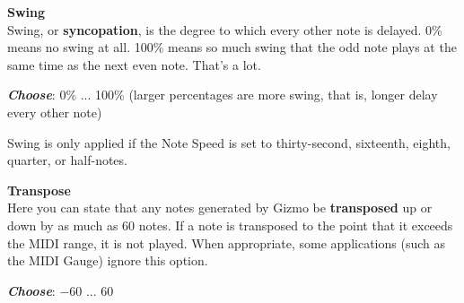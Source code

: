 \documentclass{article}
\begin{document}
\begin{description}
%	


	\item{\bf Swing}\\
			Swing, or {\bf syncopation}, is the degree to which every other note is delayed.  0\% means no swing at all.  100\% means so much swing that the odd note plays at the same time as the next even note.  That's a lot.
		\begin{description}
		\item{\bf \textit{Choose}}: 0\% ... 100\% (larger percentages are more swing, that is, longer delay every other note)
		\end{description}

		Swing is only applied if the Note Speed is set to thirty-second, sixteenth, eighth, quarter, or half-notes.

	\item{\bf  Transpose}\\
		Here you can state that any notes generated by Gizmo be {\bf transposed} up or down by as much as 60 notes. If a note is transposed to the point that it exceeds the MIDI range, it is not played.  When appropriate, some applications (such as the MIDI Gauge) ignore this option. 
		\begin{description}
		\item{\bf \textit{Choose}}: \(-60\) ... 60 
		\end{description}


\end{description}
\end{document}
